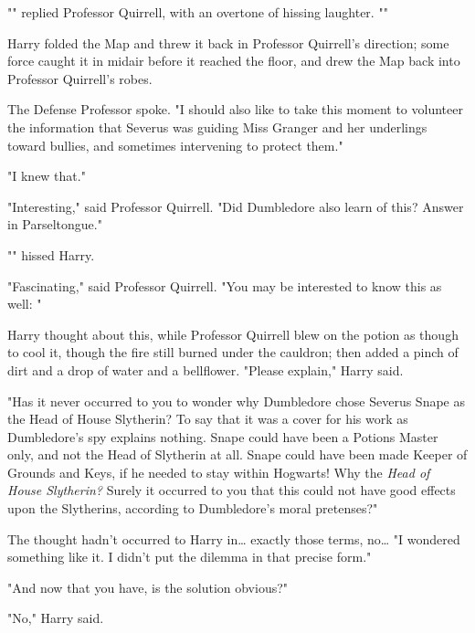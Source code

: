 "" replied Professor Quirrell, with an overtone of 
hissing laughter. ""

Harry folded the Map and threw it back in Professor Quirrell's direction; some 
force caught it in midair before it reached the floor, and drew the Map back 
into Professor Quirrell's robes.

The Defense Professor spoke. "I should also like to take this moment to 
volunteer the information that Severus was guiding Miss Granger and her 
underlings toward bullies, and sometimes intervening to protect them."

"I knew that."

"Interesting," said Professor Quirrell. "Did Dumbledore also learn of this? 
Answer in Parseltongue."

"" hissed Harry.

"Fascinating," said Professor Quirrell. "You may be interested to know this as 
well: "

Harry thought about this, while Professor Quirrell blew on the potion as though 
to cool it, though the fire still burned under the cauldron; then added a pinch 
of dirt and a drop of water and a bellflower. "Please explain," Harry said.

"Has it never occurred to you to wonder why Dumbledore chose Severus Snape as 
the Head of House Slytherin? To say that it was a cover for his work as 
Dumbledore's spy explains nothing. Snape could have been a Potions Master only, 
and not the Head of Slytherin at all. Snape could have been made Keeper of 
Grounds and Keys, if he needed to stay within Hogwarts! Why the \emph{Head of 
House Slytherin?} Surely it occurred to you that this could not have good 
effects upon the Slytherins, according to Dumbledore's moral pretenses?"

The thought hadn't occurred to Harry in{\ldots} exactly those terms, no{\ldots} 
"I wondered something like it. I didn't put the dilemma in that precise form."

"And now that you have, is the solution obvious?"

"No," Harry said.

